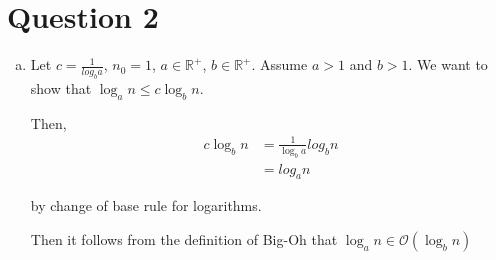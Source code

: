 \documentclass[12pt]{article}
\begin{document}
\section*{Question 2}
\begin{enumerate}[a.]
    \item

    Let $c = \frac{1}{log_b a}$, $n_0 = 1$, $a \in \mathbb{R}^{+}$, $b \in \mathbb{R}^{+}$.
    Assume $a > 1$ and $b > 1$. We want to show that $\log_a n \leq c \log_b n$.

    \bigskip

    Then,
    \setcounter{equation}{0}
    \begin{align}
        c \log_b n &= \frac{1}{\log_b a} log_b n\\
        &= log_a n
    \end{align}

    by change of base rule for logarithms.

    \bigskip

    Then it follows from the definition of Big-Oh that $\log_a n \in \mathcal{O}(\log_b n)$

\end{enumerate}
\end{document}
